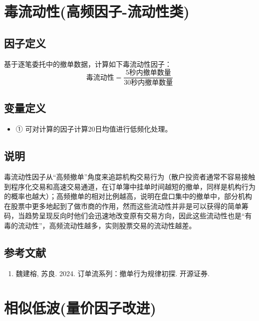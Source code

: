 \documentclass{article}
\begin{document}
\section{毒流动性(高频因子-流动性类)}

\subsection{因子定义}

基于逐笔委托中的撤单数据，计算如下毒流动性因子：
\begin{equation}
    \text{毒流动性} = \frac{5\text{秒内撤单数量}}{30\text{秒内撤单数量}}
\end{equation}

\subsection{变量定义}
\begin{itemize}
    \item ① 可对计算的因子计算20日均值进行低频化处理。
\end{itemize}

\subsection{说明}
毒流动性因子从“高频撤单”角度来追踪机构交易行为（散户投资者通常不容易接触到程序化交易和高速交易通道，在订单簿中挂单时间越短的撤单，同样是机构行为的概率也越大）；高频撤单的相对比例越高，说明在盘口集中的撤单中，部分机构在股票中更多地起到了做市商的作用，然而这些流动性并非是可以获得的简单筹码，当趋势呈现反向时他们会迅速地改变原有交易方向，因此这些流动性也是“有毒的流动性”，高频流动性越多，实则股票交易的流动性越差。

\subsection{参考文献}
\begin{enumerate}
    \item 魏建榕, 苏良. 2024. 订单流系列：撤单行为规律初探. 开源证券.
\end{enumerate}

\section{相似低波(量价因子改进)}
\end{document}
